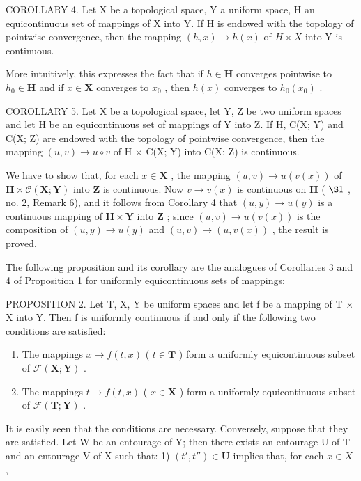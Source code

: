 COROLLARY 4. Let X be a topological space, Y a uniform space, H an equicontinuous set of mappings of X into Y. If H is endowed with the topology of pointwise convergence, then the mapping \((h, x) \to h(x)\) of \(H \times X\) into Y is continuous.

More intuitively, this expresses the fact that if \(h \in \mathbf{H}\) converges pointwise to \(h_0 \in \mathbf{H}\) and if \(x \in \mathbf{X}\) converges to \(x_0\) , then \(h(x)\) converges to \(h_0(x_0)\) .

COROLLARY 5. Let X be a topological space, let Y, Z be two uniform spaces and let H be an equicontinuous set of mappings of Y into Z. If H, C(X; Y) and C(X; Z) are endowed with the topology of pointwise convergence, then the mapping \((u, v) \to u \circ v\) of H × C(X; Y) into C(X; Z) is continuous.

We have to show that, for each \(x \in \mathbf{X}\) , the mapping \((u, v) \to u(v(x))\) of \(\mathbf{H} \times \mathcal{C}(\mathbf{X}; \mathbf{Y})\) into \(\mathbf{Z}\) is continuous. Now \(v \to v(x)\) is continuous on \(\mathbf{H}\) ( \(\S 1\) , no. 2, Remark 6), and it follows from Corollary 4 that \((u, y) \to u(y)\) is a continuous mapping of \(\mathbf{H} \times \mathbf{Y}\) into \(\mathbf{Z}\) ; since \((u, v) \to u(v(x))\) is the composition of \((u, y) \to u(y)\) and \((u, v) \to (u, v(x))\) , the result is proved.

The following proposition and its corollary are the analogues of Corollaries 3 and 4 of Proposition 1 for uniformly equicontinuous sets of mappings:

PROPOSITION 2. Let T, X, Y be uniform spaces and let f be a mapping of T × X into Y. Then f is uniformly continuous if and only if the following two conditions are satisfied:

\begin{enumerate}
\def\labelenumi{\arabic{enumi})}
\item
  The mappings \(x \to f(t, x)\) ( \(t \in \mathbf{T}\) ) form a uniformly equicontinuous subset of \(\mathcal{F}(\mathbf{X}; \mathbf{Y})\) .
\item
  The mappings \(t \to f(t, x)\) ( \(x \in \mathbf{X}\) ) form a uniformly equicontinuous subset of \(\mathcal{F}(\mathbf{T}; \mathbf{Y})\) .
\end{enumerate}

It is easily seen that the conditions are necessary. Conversely, suppose that they are satisfied. Let W be an entourage of Y; then there exists an entourage U of T and an entourage V of X such that: 1) \((t', t'') \in \mathbf{U}\) implies that, for each \(x \in X\) ,

